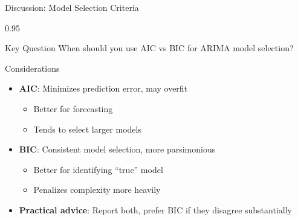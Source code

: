 \documentclass[9pt, aspectratio=169, t]{beamer}
\begin{document}
\begin{frame}{Discussion: Model Selection Criteria}
    \begin{cminipage}{0.95\textwidth}
    \begin{block}{Key Question}
        When should you use AIC vs BIC for ARIMA model selection?
    \end{block}

    \vspace{0.3cm}

    \begin{block}{Considerations}
        \begin{itemize}\setlength{\itemsep}{0pt}
            \item \textbf{AIC}: Minimizes prediction error, may overfit
                \begin{itemize}\setlength{\itemsep}{0pt}
                    \item Better for forecasting
                    \item Tends to select larger models
                \end{itemize}
            \item \textbf{BIC}: Consistent model selection, more parsimonious
                \begin{itemize}\setlength{\itemsep}{0pt}
                    \item Better for identifying ``true'' model
                    \item Penalizes complexity more heavily
                \end{itemize}
            \item \textbf{Practical advice}: Report both, prefer BIC if they disagree substantially
        \end{itemize}
    \end{block}
    \end{cminipage}
\end{frame}
\end{document}
